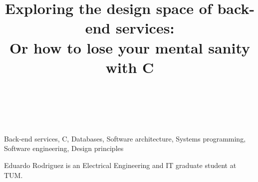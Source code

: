 \documentclass[journal]{IEEEtran}
\begin{document}
\title{Exploring the design space of back-end services: \\ Or how to lose your mental sanity with C}

\author{\\
\\
}

\maketitle


\begin{IEEEkeywords}
Back-end services, C, Databases, Software architecture, Systems programming, Software engineering, Design principles
\end{IEEEkeywords}

%
%



\nocite{*}

\begin{IEEEbiography}{Eduardo Rodriguez}
is an Electrical Engineering and IT graduate student at TUM.
\end{IEEEbiography}
\end{document}
